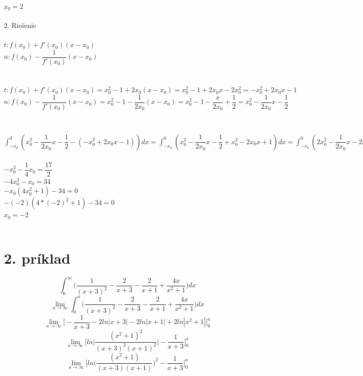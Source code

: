 \documentclass[a4paper]{article}
\begin{document}
		$x_0 = 2$\\
		\\
		2. Riešenie\\\\
		$t: f(x_0) + f'(x_0)(x - x_0)$ \\
		$n: f(x_0) - \dfrac{1} {f'(x_0)}(x - x_0)$\\
		\\
		\\
		$t: f(x_0) + f'(x_0)(x - x_0) = x_0^2-1+2x_0(x-x_0) = x_0^2-1+2x_0x-2x_0^2 = -x_0^2+2x_0x-1$ \\
		$n: f(x_0) - \dfrac{1} {f'(x_0)}(x - x_0) = x_0^2-1-\dfrac{1} {2x_0}(x-x_0) = x_0^2-1-\dfrac{x} {2x_0}+\dfrac{1}{2} = x_0^2 - \dfrac{1}{2x_0}x - \dfrac{1}{2}$\\
		\\
		\\	
		$
		\int_{-x_0}^{0} 
		(x_0^2 - \dfrac{1}{2x_0}x - \dfrac{1}{2} - (-x_0^2+2x_0x-1)) dx =
		\int_{-x_0}^{0} 
		(x_0^2 - \dfrac{1}{2x_0}x - \dfrac{1}{2} + x_0^2-2x_0x+1) dx =
		\int_{-x_0}^{0} 
		(2x_0^2 - \dfrac{1}{2x_0}x -2x_0x+ \dfrac{1}{2} ) dx =
		2x_0^2\int_{-x_0}^{0} 1dx - \dfrac{1}{2x_0}\int_{-x_0}^{0} xdx -2x_0\int_{-x_0}^{0}xdx+ 	\dfrac{1}{2}\int_{-x_0}^{0} 1dx =
		\left[2x_0^2x - \dfrac{1}{2x_0}\dfrac{x^2}{2} - 2x_0\dfrac{x^2}{2} + \dfrac{1}{2}x\right]_{-x_0}^0 = 0 - \left(2x_0^3 - \dfrac{x_0^2}{4x_0} - \dfrac{2x_0^3}{2} + \dfrac{1}{2}x_0\right) =
		-2x_0^3 + \dfrac{x_0}{4} + x_0^3 - \dfrac{1}{2}x_0 = -x_0^3 - \dfrac{1}{4}x_0
		$
	
	
		$-x_0^3 - \dfrac{1}{4}x_0 = \dfrac{17}{2}$ \\
		$-4x_0^3 -x_0 = 34$\\
		$-x_0(4x_0^2+1) - 34 = 0$\\
		$-(-2)(4*(-2)^2 + 1) -34 = 0$\\
		$x_0 = -2$\\
		\\
	
	\section*{2. príklad}
	
	$$\int_{0}^{\infty} \bigg( \frac{1}{(x+3)^2} - \frac{2}{x+3} - \frac{2}{x+1} + \frac{4x}{x^2+1} \bigg) dx$$
	$$\lim_{a\to\infty} \int_{0}^{a} \bigg( \frac{1}{(x+3)^2} - \frac{2}{x+3} - \frac{2}{x+1} + \frac{4x}{x^2+1} \bigg) dx$$
	$$\lim_{a\to\infty}  \bigg[- \frac{1}{x+3} -2ln|x+3| -2ln|x+1| +2ln|x^2+1| \bigg] ^a _{0}$$
	$$\lim_{a\to\infty}  \bigg[   ln \bigg| \frac{(x^2+1)^2}{(x+3)^2(x+1)^2}   \bigg|  - \frac{1}{x+3}  \bigg] ^a _{0}$$
	$$\lim_{a\to\infty}  \bigg[   ln \bigg( \frac{(x^2+1)}{(x+3)(x+1)}   \bigg)^2  - \frac{1}{x+3}  \bigg] ^a _{0}$$
	
\end{document}
